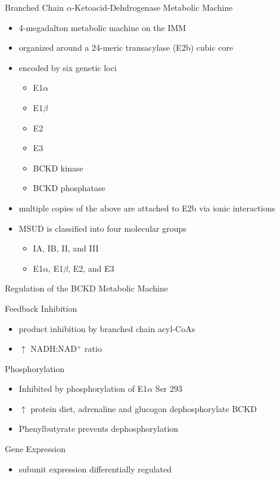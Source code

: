 \documentclass[presentation, smaller]{beamer}
\begin{document}
\begin{frame}[label={sec:orgheadline9}]{Branched Chain \(\alpha\)-Ketoacid-Dehdrogenase Metabolic Machine}
\begin{itemize}
\item 4-megadalton metabolic machine on the IMM
\item organized around a 24-meric transacylase (E2b) cubic core
\item encoded by six genetic loci
\begin{itemize}
\item E1\(\alpha\)
\item E1\(\beta\)
\item E2
\item E3
\item BCKD kinase
\item BCKD phosphatase
\end{itemize}
\item multiple copies of the above are attached to E2b via ionic interactions
\item MSUD is classified into four molecular groups
\begin{itemize}
\item IA, IB, II, and III
\item E1\(\alpha\), E1\(\beta\), E2, and E3
\end{itemize}
\end{itemize}
\end{frame}

\begin{frame}[label={sec:orgheadline10}]{Regulation of the BCKD Metabolic Machine}
\begin{block}{Feedback Inhibition}
\begin{itemize}
\item product inhibition by branched chain acyl-CoAs
\item \(\uparrow\) NADH:NAD\(^{\text{+}}\) ratio
\end{itemize}
\end{block}
\begin{block}{Phosphorylation}
\begin{itemize}
\item Inhibited by phosphorylation of E1\(\alpha\) Ser 293
\item \(\uparrow\) protein diet, adrenaline and glucogon dephosphorylate BCKD
\item Phenylbutyrate prevents dephosphorylation
\end{itemize}
\end{block}
\begin{block}{Gene Expression}
\begin{itemize}
\item subunit expression differentially regulated
\end{itemize}
\end{block}
\end{frame}
\end{document}
